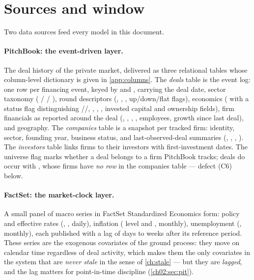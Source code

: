 
\section{Sources and window}\label{ch02:sec:sources}

Two data sources feed every model in this document.

\paragraph{PitchBook: the event-driven layer.} The deal history of the
private market, delivered as three relational tables whose column-level
dictionary is given in \cref{app:columns}. The \emph{deals} table is the
event log: one row per financing event, keyed by  and
, carrying the deal date, sector taxonomy
( /  / ), round
descriptors (, , ,
up/down/flat flags), economics ( with a status flag
distinguishing //,
, ,
, invested capital and ownership fields), firm
financials as reported around the deal (, ,
, , employees, growth since last
deal), and geography. The \emph{companies} table is a snapshot per tracked
firm: identity, sector, founding year, business status, and
last-observed-deal summaries (, ,
, ). The \emph{investors} table links
firms to their investors with first-investment dates. The universe flag
 marks whether a deal belongs to a firm PitchBook
tracks; deals do occur with ,
whose firms have \emph{no row} in the companies table --- defect (C6)
below.

\paragraph{FactSet: the market-clock layer.} A small panel of macro series
in FactSet Standardized Economics form: policy and effective rates
(, , daily), inflation ( level and
, monthly), unemployment (, monthly), each
published with a lag of days to weeks after its reference period. These
series are the exogenous covariates of the ground process: they move on
calendar time regardless of deal activity, which makes them the only
covariates in the system that are \emph{never stale} in the sense of
\cref{ch:stale} --- but they are \emph{lagged}, and the lag matters for
point-in-time discipline (\cref{ch02:sec:pit}).

